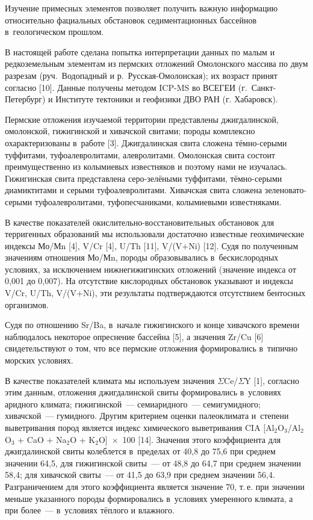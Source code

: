  

\makeProcTitleRazdel
{}

Изучение примесных элементов позволяет получить важную информацию относительно фациальных обстановок седиментационных бассейнов в~геологическом прошлом.

В настоящей работе сделана попытка интерпретации данных по малым и редкоземельным элементам из пермских отложений Омолонского массива по двум разрезам (руч.~Водопадный и р.~Русская-Омолонская); их возраст принят согласно [10]. Данные получены методом ICP-MS во ВСЕГЕИ (г.~Санкт-Петербург) и Институте тектоники и геофизики ДВО РАН (г. Хабаровск).

Пермские отложения изучаемой территории представлены джигдалинской, омолонской, гижигинской и хивачской свитами; породы комплексно охарактеризованы в~работе [3]. Джигдалинская свита сложена тёмно-серыми туффитами, туфоалевролитами, алевролитами. Омолонская свита состоит преимущественно из колымиевых известняков и поэтому нами не изучалась. Гижигинская свита представлена серо-зелёными туффитами, тёмно-серыми диамиктитами и серыми туфоалевролитами. Хивачская свита сложена зеленовато-серыми туфоалевролитами, туфопесчаниками, колымиевыми известняками.

В качестве показателей окислительно-восстановительных обстановок для терригенных образований мы использовали достаточно известные геохимические индексы Мо/Мn [4], V/Cr [4], U/Th [11], V/(V+Ni) [12]. Судя по полученным значениям отношения Мо/Мn, породы образовывались в~бескислородных условиях, за исключением нижнегижигинских отложений (значение индекса от 0,001 до 0,007). На отсутствие кислородных обстановок указывают и индексы V/Cr, U/Th, V/(V+Ni), эти результаты подтверждаются отсутствием
бентосных организмов.

Судя по отношению Sr/Ba, в~начале гижигинского и конце хивачского времени наблюдалось некоторое опреснение бассейна [5], а значения Zr/Cu [6] свидетельствуют о том, что все пермские отложения формировались в~типично морских условиях.

В качестве показателей климата мы используем значения $\Sigma$Ce/$\Sigma$Y [1], согласно этим данным, отложения джигдалинской свиты формировались в~условиях аридного климата; гижигинской~--- семиаридного~--- семигумидного; хивачской~--- гумидного. Другим критерием оценки палеоклимата и~степени выветривания пород является индекс химического выветривания CIA [Al$_{2}$O$_{3}$/Al$_{2}$O$_{3}$ + CaO + Na$_{2}$O + K$_{2}$O]~$\times$~100 [14]. Значения этого коэффициента для джигдалинской свиты колеблется в~пределах от 40,8 до 75,6 при среднем значении 64,5, для гижигинской свиты~--- от 48,8 до 64,7 при среднем значении 58,4; для хивачской свиты~--- от 41,5 до 63,9 при среднем значении 56,4. \enlargethispage{\baselineskip}Разграничением для этого коэффициента является значение 70, т.\,е. при значении меньше указанного породы формировались в~условиях умеренного климата, а при более~--- в~условиях тёплого и влажного.


